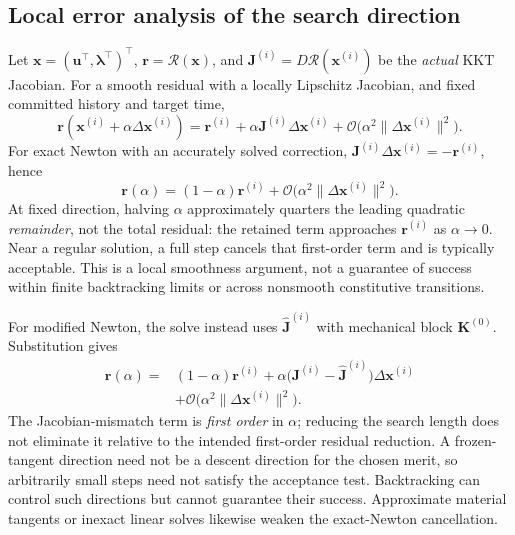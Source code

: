 \documentclass[11pt,a4paper]{article}
\newcommand{\vct}[1]{\mathbf{#1}}
\begin{document}
\subsection{Local error analysis of the search direction}
\label{sec:kkt-search-error}

Let $\vct x=(\vct u^\top,\vct\lambda^\top)^\top$, $\vct r=\mathcal R(\vct x)$, and
$\vct J^{(i)}=D\mathcal R(\vct x^{(i)})$ be the \emph{actual} KKT Jacobian. For a smooth residual with a locally Lipschitz Jacobian, and fixed committed history and target time,
\begin{equation}
\vct r(\vct x^{(i)}+\alpha\Delta\vct x^{(i)})
=\vct r^{(i)}+\alpha\vct J^{(i)}\Delta\vct x^{(i)}
+\mathcal O\bigl(\alpha^2\lVert\Delta\vct x^{(i)}\rVert^2\bigr).
\end{equation}
For exact Newton with an accurately solved correction, $\vct J^{(i)}\Delta\vct x^{(i)}=-\vct r^{(i)}$, hence
\begin{equation}
\boxed{\vct r(\alpha)=(1-\alpha)\vct r^{(i)}
+\mathcal O\bigl(\alpha^2\lVert\Delta\vct x^{(i)}\rVert^2\bigr).}
\label{eq:kkt-search-exact-error}
\end{equation}
At fixed direction, halving $\alpha$ approximately quarters the leading quadratic \emph{remainder}, not the total residual: the retained term approaches $\vct r^{(i)}$ as $\alpha\to0$. Near a regular solution, a full step cancels that first-order term and is typically acceptable. This is a local smoothness argument, not a guarantee of success within finite backtracking limits or across nonsmooth constitutive transitions.

For modified Newton, the solve instead uses $\widehat{\vct J}^{(i)}$ with mechanical block $\vct K^{(0)}$. Substitution gives
\begin{equation}
\boxed{\begin{aligned}
\vct r(\alpha)={}&(1-\alpha)\vct r^{(i)}
+\alpha\bigl(\vct J^{(i)}-\widehat{\vct J}^{(i)}\bigr)\Delta\vct x^{(i)}\\
&+\mathcal O\bigl(\alpha^2\lVert\Delta\vct x^{(i)}\rVert^2\bigr).
\end{aligned}}
\label{eq:kkt-search-modified-error}
\end{equation}
The Jacobian-mismatch term is \emph{first order} in $\alpha$; reducing the search length does not eliminate it relative to the intended first-order residual reduction. A frozen-tangent direction need not be a descent direction for the chosen merit, so arbitrarily small steps need not satisfy the acceptance test. Backtracking can control such directions but cannot guarantee their success. Approximate material tangents or inexact linear solves likewise weaken the exact-Newton cancellation.
\end{document}
